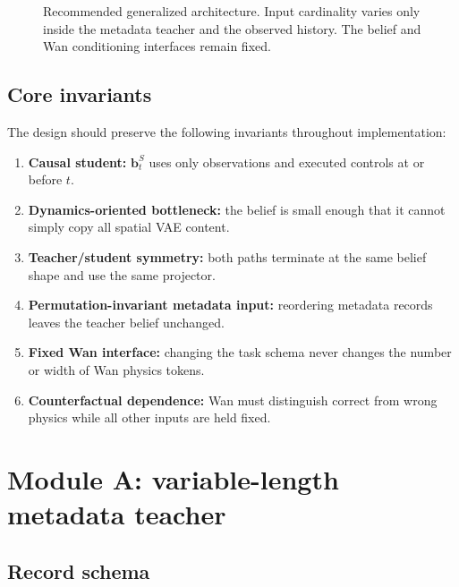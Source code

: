 \documentclass[11pt]{article}
\newcommand{\bvec}{\bm b}
\begin{document}
\begin{figure}[H]
{}
\caption{Recommended generalized architecture.  Input cardinality varies only
inside the metadata teacher and the observed history.  The belief and Wan
conditioning interfaces remain fixed.}
\label{fig:architecture}
\end{figure}

\subsection{Core invariants}

The design should preserve the following invariants throughout implementation:
\begin{enumerate}
  \item \textbf{Causal student:} $\bvec_t^S$ uses only observations and executed
  controls at or before $t$.
  \item \textbf{Dynamics-oriented bottleneck:} the belief is small enough that
  it cannot simply copy all spatial VAE content.
  \item \textbf{Teacher/student symmetry:} both paths terminate at the same
  belief shape and use the same projector.
  \item \textbf{Permutation-invariant metadata input:} reordering metadata
  records leaves the teacher belief unchanged.
  \item \textbf{Fixed Wan interface:} changing the task schema never changes the
  number or width of Wan physics tokens.
  \item \textbf{Counterfactual dependence:} Wan must distinguish correct from
  wrong physics while all other inputs are held fixed.
\end{enumerate}

\section{Module A: variable-length metadata teacher}

\subsection{Record schema}
\end{document}
